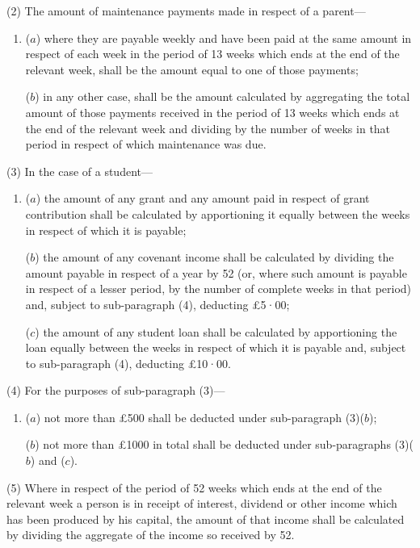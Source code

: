 \documentclass[12pt,a4paper]{article}
\begin{document}
(2) The amount of maintenance payments made in respect of a parent—
\begin{enumerate}\item[]
($a$) where they are payable weekly and have been paid at the same amount in respect of each week in the period of 13 weeks which ends at the end of the relevant week, shall be the amount equal to one of those payments;

($b$) in any other case, shall be the amount calculated by aggregating the total amount of those payments received in the period of 13 weeks which ends at the end of the relevant week and dividing by the number of weeks in that period in respect of which maintenance was due.
\end{enumerate}

(3) In the case of a student—
\begin{enumerate}\item[]
($a$) the amount of any grant and any amount paid in respect of grant contribution shall be calculated by apportioning it equally between the weeks in respect of which it is payable;

($b$) the amount of any covenant income shall be calculated by dividing the amount payable in respect of a year by 52 (or, where such amount is payable in respect of a lesser period, by the number of complete weeks in that period) and, subject to sub-paragraph (4), deducting £5·00;

($c$) the amount of any student loan shall be calculated by apportioning the loan equally between the weeks in respect of which it is payable and, subject to sub-paragraph (4), deducting £10·00.
\end{enumerate}

(4) For the purposes of sub-paragraph (3)—
\begin{enumerate}\item[]
($a$) not more than £500 shall be deducted under sub-paragraph (3)($b$);

($b$) not more than £1000 in total shall be deducted under sub-\hspace{0pt}paragraphs (3)($b$) and ($c$).
\end{enumerate}

(5) Where in respect of the period of 52 weeks which ends at the end of the relevant week a person is in receipt of interest, dividend or other income which has been produced by his capital, the amount of that income shall be calculated by dividing the aggregate of the income so received by 52.
\end{document}
